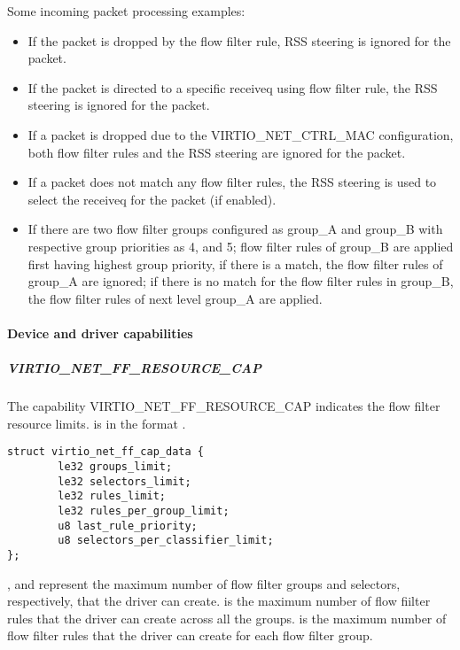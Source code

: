 Some incoming packet processing examples:
\begin{itemize}
\item If the packet is dropped by the flow filter rule, RSS
      steering is ignored for the packet.
\item If the packet is directed to a specific receiveq using flow filter rule,
      the RSS steering is ignored for the packet.
\item If a packet is dropped due to the VIRTIO_NET_CTRL_MAC configuration,
      both flow filter rules and the RSS steering are ignored for the packet.
\item If a packet does not match any flow filter rules,
      the RSS steering is used to select the receiveq for the packet (if enabled).
\item If there are two flow filter groups configured as group_A and group_B
      with respective group priorities as 4, and 5; flow filter rules of
      group_B are applied first having highest group priority, if there is a match,
      the flow filter rules of group_A are ignored; if there is no match for
      the flow filter rules in group_B, the flow filter rules of next level group_A are applied.
\end{itemize}

\paragraph{Device and driver capabilities}
\label{par:Device Types / Network Device / Device Operation / Flow filter / Device and driver capabilities}

\subparagraph{VIRTIO_NET_FF_RESOURCE_CAP}
\label{par:Device Types / Network Device / Device Operation / Flow filter / Device and driver capabilities / VIRTIO-NET-FF-RESOURCE-CAP}

The capability VIRTIO_NET_FF_RESOURCE_CAP indicates the flow filter resource limits.
 is in the format
.

\begin{lstlisting}
struct virtio_net_ff_cap_data {
        le32 groups_limit;
        le32 selectors_limit;
        le32 rules_limit;
        le32 rules_per_group_limit;
        u8 last_rule_priority;
        u8 selectors_per_classifier_limit;
};
\end{lstlisting}

, and  represent the maximum
number of flow filter groups and selectors, respectively, that the driver can create.
  is the maximum number of
flow fiilter rules that the driver can create across all the groups.
 is the maximum number of flow filter rules that the driver
can create for each flow filter group.

